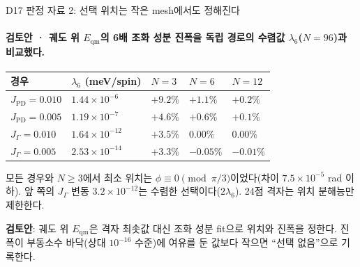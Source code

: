 \begin{frame}[label=state-selection-mesh]{D17 판정 자료 2: 선택 위치는 작은 mesh에서도 정해진다}
  \framesubtitle{검토안 · 궤도 위 $E_{\mathrm{qm}}$의 6배 조화 성분 진폭을 독립 경로의 수렴값 $\lambda_6$($N=96$)과 비교했다.}
  \small
  \begin{tabularx}{\textwidth}{@{}YP{2.7cm}P{1.6cm}P{1.6cm}P{1.6cm}@{}}
    \toprule
    경우 & $\lambda_6$ (meV/spin) & $N=3$ & $N=6$ & $N=12$ \\
    \midrule
    $J_{\mathrm{PD}}=0.010$ & $1.44\times10^{-6}$ & $+9.2\%$ & $+1.1\%$ & $+0.2\%$ \\
    $J_{\mathrm{PD}}=0.005$ & $1.19\times10^{-7}$ & $+4.6\%$ & $+0.6\%$ & $+0.1\%$ \\
    $J_\Gamma=0.010$ & $1.64\times10^{-12}$ & $+3.5\%$ & $0.00\%$ & $0.00\%$ \\
    $J_\Gamma=0.005$ & $2.53\times10^{-14}$ & $+3.3\%$ & $-0.05\%$ & $-0.01\%$ \\
    \bottomrule
  \end{tabularx}
  \par\medskip
  모든 경우와 $N\ge3$에서 최소 위치는 $\phi\equiv0\pmod{\pi/3}$이었다(차이 $7.5\times10^{-5}$ rad 이하).
  앞 쪽의 $J_\Gamma$ 변동 $3.2\times10^{-12}$는 수렴한 선택이다($2\lambda_6$). 24점 격자는 위치 분해능만 제한한다.
  \par\medskip
  \textbf{검토안}: 궤도 위 $E_{\mathrm{qm}}$은 격자 최솟값 대신 조화 성분 fit으로 위치와 진폭을 정한다.
  진폭이 부동소수 바닥(상대 $10^{-16}$ 수준)에 여유를 둔 값보다 작으면 ``선택 없음''으로 기록한다.
  \par\medskip
\end{frame}

